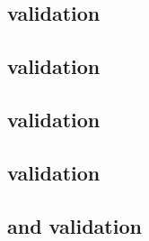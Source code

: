 \begin{sbmlenum}
\end{sbmlenum} \subsection*{ validation} \begin{sbmlenum}


\end{sbmlenum} \subsection*{ validation} \begin{sbmlenum}


\begin{blockChanged}


\end{blockChanged}

\end{sbmlenum} \subsection*{ validation} \begin{sbmlenum}


\end{sbmlenum} \subsection*{ validation} \begin{sbmlenum}


\end{sbmlenum} \subsection*{ and  validation} \begin{sbmlenum}


\end{sbmlenum}
